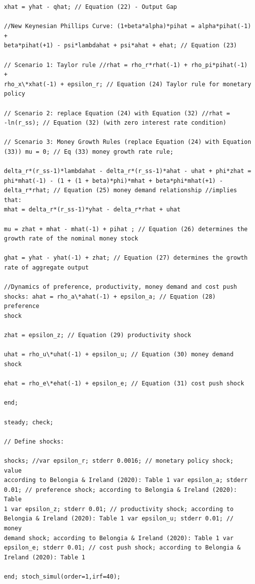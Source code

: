 \documentclass[11pt,preprint, authoryear]{elsarticle}
\numberwithin{equation}{section}
\numberwithin{figure}{section}
\numberwithin{table}{section}
\begin{document}
\begin{verbatim}
xhat = yhat - qhat; // Equation (22) - Output Gap

//New Keynesian Phillips Curve: (1+beta*alpha)*pihat = alpha*pihat(-1) +
beta*pihat(+1) - psi*lambdahat + psi*ahat + ehat; // Equation (23)

// Scenario 1: Taylor rule //rhat = rho_r*rhat(-1) + rho_pi*pihat(-1) +
rho_x\*xhat(-1) + epsilon_r; // Equation (24) Taylor rule for monetary
policy

// Scenario 2: replace Equation (24) with Equation (32) //rhat =
-ln(r_ss); // Equation (32) (with zero interest rate condition)

// Scenario 3: Money Growth Rules (replace Equation (24) with Equation
(33)) mu = 0; // Eq (33) money growth rate rule;

delta_r*(r_ss-1)*lambdahat - delta_r*(r_ss-1)*ahat - uhat + phi*zhat =
phi*mhat(-1) - (1 + (1 + beta)*phi)*mhat + beta*phi*mhat(+1) -
delta_r*rhat; // Equation (25) money demand relationship //implies that:
mhat = delta_r*(r_ss-1)*yhat - delta_r*rhat + uhat

mu = zhat + mhat - mhat(-1) + pihat ; // Equation (26) determines the
growth rate of the nominal money stock

ghat = yhat - yhat(-1) + zhat; // Equation (27) determines the growth
rate of aggregate output

//Dynamics of preference, productivity, money demand and cost push
shocks: ahat = rho_a\*ahat(-1) + epsilon_a; // Equation (28) preference
shock

zhat = epsilon_z; // Equation (29) productivity shock

uhat = rho_u\*uhat(-1) + epsilon_u; // Equation (30) money demand shock

ehat = rho_e\*ehat(-1) + epsilon_e; // Equation (31) cost push shock

end;

steady; check;

// Define shocks:

shocks; //var epsilon_r; stderr 0.0016; // monetary policy shock; value
according to Belongia & Ireland (2020): Table 1 var epsilon_a; stderr
0.01; // preference shock; according to Belongia & Ireland (2020): Table
1 var epsilon_z; stderr 0.01; // productivity shock; according to
Belongia & Ireland (2020): Table 1 var epsilon_u; stderr 0.01; // money
demand shock; according to Belongia & Ireland (2020): Table 1 var
epsilon_e; stderr 0.01; // cost push shock; according to Belongia &
Ireland (2020): Table 1

end; stoch_simul(order=1,irf=40);
\end{verbatim}
\end{document}

